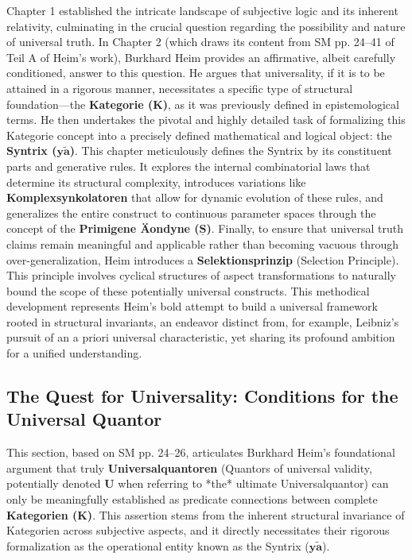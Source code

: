 \documentclass[12pt]{article}
\newcommand{\kategorie}{\bm{K}}
\newcommand{\syntrix}{\bm{y\widetilde{a}}}
\newcommand{\universalquantor}{\bm{U}}
\begin{document}
Chapter 1 established the intricate landscape of subjective logic and its inherent relativity, culminating in the crucial question regarding the possibility and nature of universal truth. In Chapter 2 (which draws its content from SM pp. 24–41 of Teil A of Heim's work), Burkhard Heim provides an affirmative, albeit carefully conditioned, answer to this question. He argues that universality, if it is to be attained in a rigorous manner, necessitates a specific type of structural foundation—the \textbf{Kategorie (\(\kategorie\))}, as it was previously defined in epistemological terms. He then undertakes the pivotal and highly detailed task of formalizing this Kategorie concept into a precisely defined mathematical and logical object: the \textbf{Syntrix (\(\syntrix\))}. This chapter meticulously defines the Syntrix by its constituent parts and generative rules. It explores the internal combinatorial laws that determine its structural complexity, introduces variations like \textbf{Komplexsynkolatoren} that allow for dynamic evolution of these rules, and generalizes the entire construct to continuous parameter spaces through the concept of the \textbf{Primigene \"{A}ondyne (\(\underline{\bm{S}}\))}. Finally, to ensure that universal truth claims remain meaningful and applicable rather than becoming vacuous through over-generalization, Heim introduces a \textbf{Selektionsprinzip} (Selection Principle). This principle involves cyclical structures of aspect transformations to naturally bound the scope of these potentially universal constructs. This methodical development represents Heim's bold attempt to build a universal framework rooted in structural invariants, an endeavor distinct from, for example, Leibniz's pursuit of an a priori universal characteristic, yet sharing its profound ambition for a unified understanding.

\subsection{The Quest for Universality: Conditions for the Universal Quantor}
\label{sec:universal_quantor_conditions}

This section, based on SM pp. 24--26, articulates Burkhard Heim's foundational argument that truly \textbf{Universalquantoren} (Quantors of universal validity, potentially denoted \( \universalquantor \) when referring to *the* ultimate Universalquantor) can only be meaningfully established as predicate connections between complete \textbf{Kategorien (\(\kategorie\))}. This assertion stems from the inherent structural invariance of Kategorien across subjective aspects, and it directly necessitates their rigorous formalization as the operational entity known as the Syntrix (\(\syntrix\)).
\end{document}

